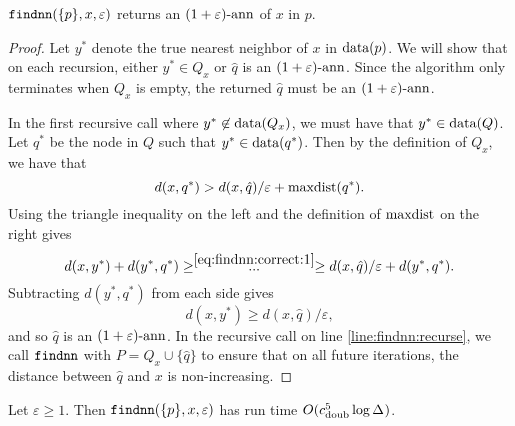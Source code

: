 \documentclass[../main.tex]{subfiles}
\newcommand{\dist}[2]{\distf({#1},{#2})}
\newcommand{\distf}{d}
\newcommand{\aspect}[1]{\Delta_{#1}}
\newcommand{\cdoub}{c_\textnormal{doub}}
\newcommand{\chole}{c_\textnormal{hole}}
\newcommand{\q}{\ensuremath q}
\newcommand{\mkfunction}[1]{\ifmmode{\textnormal{{#1}}}}
\newcommand{\maxdist}[1]    {\mkfunction{maxdist}({#1})}
\newcommand{\data}[1]       {\mkfunction{data}({#1})}
\newcommand{\mkprocedure}[1]{\textnormal{\ttfamily {#1}}}
\newcommand{\findnn}{\mkprocedure{findnn}}
\begin{document}
\begin{theorem}
    \label{theorem:findnn:correct}
    $\findnn(\{p\},x,\varepsilon)$ returns an $(1+\varepsilon)\text{-ann}$ of $x$ in $p$.
\end{theorem}
\begin{proof}
    Let $y^*$ denote the true nearest neighbor of $x$ in $\data{p}$.
    We will show that on each recursion,
    either $y^* \in Q_x$ or $\hat q$ is an $(1+\varepsilon)\text{-ann}$.
    Since the algorithm only terminates when $Q_x$ is empty,
    the returned $\hat q$ must be an $(1+\varepsilon)\text{-ann}$.

    In the first recursive call where $y^* \not\in\data{Q_x}$,
    we must have that $y^* \in \data{Q}$.
    Let $q^*$ be the node in $Q$ such that $y^* \in\data{\q^*}$.
    Then by the definition of $Q_x$, we have that
    \begin{equation}
        \label{eq:findnn:correct:1}
        \dist{x}{q^*}
        > \dist{x}{\hat q}/\varepsilon + \maxdist{q^*} 
        .
    \end{equation}
    Using the triangle inequality on the left and the definition of $\mkfunction{maxdist}$ on the right gives
    \begin{equation}
        \dist{x}{y^*} + \dist{y^*}{q^*} 
        \ge \stackrel{\eqref{eq:findnn:correct:1}}{~~~~...~~~~}
        \ge \dist{x}{\hat q}/\varepsilon + \dist{y^*}{q^*}
        .
    \end{equation}
    Subtracting $\dist{y^*}{q^*}$ from each side gives
    \begin{equation}
        \dist{x}{y^*} \ge \dist{x}{\hat q}/\varepsilon
        ,
    \end{equation}
    and so $\hat q$ is an $(1+\varepsilon)\text{-ann}$.
    In the recursive call on line \ref{line:findnn:recurse},
    we call $\findnn$ with $P=Q_x\cup\{\hat q\}$ to ensure that on all future iterations,
    the distance between $\hat q$ and $x$ is non-increasing.
\end{proof}

\begin{theorem}
    \label{theorem:findnn:runtime:approx}
    Let $\varepsilon\ge1$.
    Then $\findnn(\{p\},x,\varepsilon)$ has run time $O(\cdoub^5\log\aspect{})$.
\end{theorem}
\end{document}

